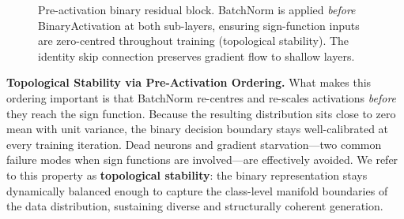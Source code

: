 \documentclass[twocolumn, journal]{IEEEtran}
\begin{document}
\begin{figure}[t]
\centering

\caption{Pre-activation binary residual block. BatchNorm is applied \emph{before}
BinaryActivation at both sub-layers, ensuring sign-function inputs are
zero-centred throughout training (topological stability). The identity skip
connection preserves gradient flow to shallow layers.}
\label{fig:block}
\end{figure}

\textbf{Topological Stability via Pre-Activation Ordering.} What makes this ordering
important is that BatchNorm re-centres and re-scales activations \emph{before} they
reach the sign function.  Because the resulting distribution sits close to zero mean
with unit variance, the binary decision boundary stays well-calibrated at every
training iteration. Dead neurons and gradient starvation---two common failure modes when
sign functions are involved---are effectively avoided. We refer to this property as
\textbf{topological stability}: the binary representation stays dynamically balanced
enough to capture the class-level manifold boundaries of the data distribution,
sustaining diverse and structurally coherent generation.
\end{document}
